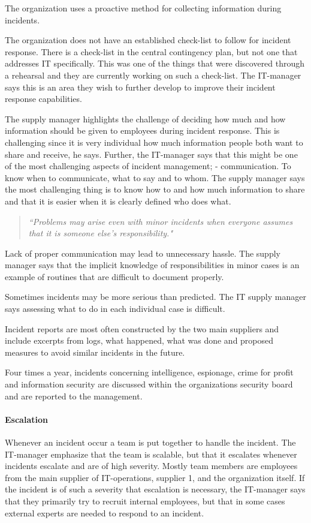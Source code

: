 The organization uses a proactive method for collecting information during incidents. %

The organization does not have an established check-list to follow for incident response. There is a check-list in the central contingency plan, but not one that addresses IT specifically. This was one of the things that were discovered through a rehearsal and they are currently working on such a check-list. The IT-manager says this is an area they wish to further develop to improve their incident response capabilities. 

The supply manager highlights the challenge of deciding how much and how information should be given to employees during incident response. This is challenging since it is very individual how much information people both want to share and receive, he says. Further, the IT-manager says that this might be one of the most challenging aspects of incident management; - communication. To know when to communicate, what to say and to whom. The supply manager says the most challenging thing is to know how to and how much information to share and that it is easier when it is clearly defined who does what. 

\begin{quote}
\textit{``Problems may arise even with minor incidents when everyone assumes that it is someone else's responsibility."}
\end{quote}
Lack of proper communication may lead to unnecessary hassle. The supply manager says that the implicit knowledge of responsibilities in minor cases is an example of routines that are difficult to document properly.

Sometimes incidents may be more serious than predicted. The IT supply manager says assessing what to do in each individual case is difficult. 

Incident reports are most often constructed by the two main suppliers and include excerpts from logs, what happened, what was done and proposed measures to avoid similar incidents in the future.

Four times a year, incidents concerning intelligence, espionage, crime for profit and information security are discussed within the organizations security board and are reported to the management.  

\paragraph{Escalation}
Whenever an incident occur a team is put together to handle the incident. The IT-manager emphasize that the team is scalable, but that it escalates whenever incidents escalate and are of high severity. Mostly team members are employees from the main supplier of IT-operations, supplier 1, and the organization itself. If the incident is of such a severity that escalation is necessary, the IT-manager says that they primarily try to recruit internal employees, but that in some cases external experts are needed to respond to an incident.

